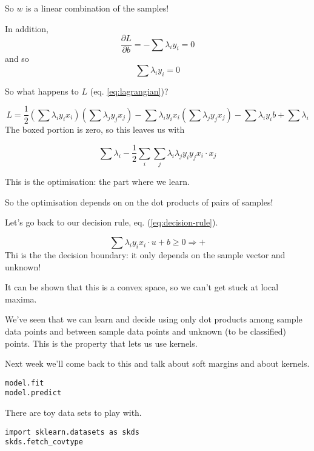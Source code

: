 So $w$ is a linear combination of the samples!

In addition,
\begin{displaymath}
  \frac{\partial L}{\partial b} = -\sum \lambda_i y_i = 0
\end{displaymath}
and so
\begin{equation}
  \label{eq:b}
  \sum \lambda_i y_i = 0
\end{equation}

So what happens to $L$ (eq. \ref{eq:lagrangian})?

\bigskip

\begin{equation}
  \label{eq:learning-rule}
  L = \frac 12 \left( \sum \lambda_i y_i x_i\right)
  \left(\sum \lambda_j y_j x_j\right)
  -
  \sum \lambda_i y_i x_i
  \left(\sum \lambda_j y_j x_j\right)
  - \boxed{\sum \lambda_i y_i} b + \sum \lambda_i
\end{equation}
The boxed portion is zero, so this leaves us with
\hspace{2mm} 

\begin{equation}
  \label{eq:recognition-rule}
  \sum\lambda_i - \frac 12 \sum_i \sum_j \lambda_i \lambda_j y_i y_j
  x_i\cdot x_j
\end{equation}

This is the optimisation: the part where we learn.

So the optimisation depends on on the dot products of pairs of
samples!

\bigskip

Let's go back to our decision rule, eq. (\ref{eq:decision-rule}).

\begin{displaymath}
  \sum \lambda_i y_i x_i\cdot u + b \ge 0 \Rightarrow +
\end{displaymath}
Thi is the the decision boundary: it only depends on the sample vector
and unknown!

It can be shown that this is a convex space, so we can't get stuck at
local maxima.

We've seen that we can learn and decide using only dot products among
sample data points and between sample data points and unknown (to be
classified) points.  This is the property that lets us use kernels.

\bigskip

Next week we'll come back to this and talk about soft margins and
about kernels.

\bigskip



\begin{verbatim}
model.fit
model.predict
\end{verbatim}

There are toy data sets to play with.

\begin{verbatim}
import sklearn.datasets as skds
skds.fetch_covtype
\end{verbatim}



